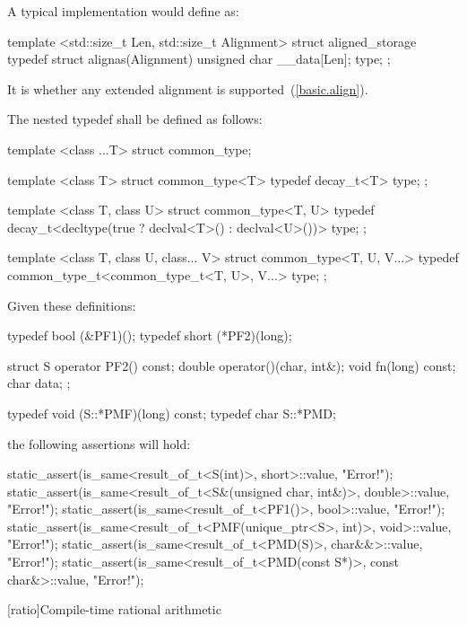 \pnum
\enternote A typical implementation would define  as:

\begin{codeblock}
template <std::size_t Len, std::size_t Alignment>
struct aligned_storage {
  typedef struct {
    alignas(Alignment) unsigned char __data[Len];
  } type;
};
\end{codeblock}
\exitnote

\pnum
It is  whether any extended alignment is
supported~(\ref{basic.align}).

\pnum
The nested typedef  shall be defined as follows:

\begin{codeblock}
template <class ...T> struct common_type;

template <class T>
struct common_type<T> {
  typedef decay_t<T> type;
};

template <class T, class U>
struct common_type<T, U> {
  typedef decay_t<decltype(true ? declval<T>() : declval<U>())> type;
};

template <class T, class U, class... V>
struct common_type<T, U, V...> {
  typedef common_type_t<common_type_t<T, U>, V...> type;
};
\end{codeblock}

\pnum
\enterexample
Given these definitions:
\begin{codeblock}
typedef bool (&PF1)();
typedef short (*PF2)(long);

struct S {
  operator PF2() const;
  double operator()(char, int&);
  void fn(long) const;
  char data;
};

typedef void (S::*PMF)(long) const;
typedef char S::*PMD;
\end{codeblock}

the following assertions will hold:

\begin{codeblock}
static_assert(is_same<result_of_t<S(int)>, short>::value, "Error!");
static_assert(is_same<result_of_t<S&(unsigned char, int&)>, double>::value, "Error!");
static_assert(is_same<result_of_t<PF1()>, bool>::value, "Error!");
static_assert(is_same<result_of_t<PMF(unique_ptr<S>, int)>, void>::value, "Error!");
static_assert(is_same<result_of_t<PMD(S)>, char&&>::value, "Error!");
static_assert(is_same<result_of_t<PMD(const S*)>, const char&>::value, "Error!");
\end{codeblock}
\exitexample

[ratio]{Compile-time rational arithmetic}


